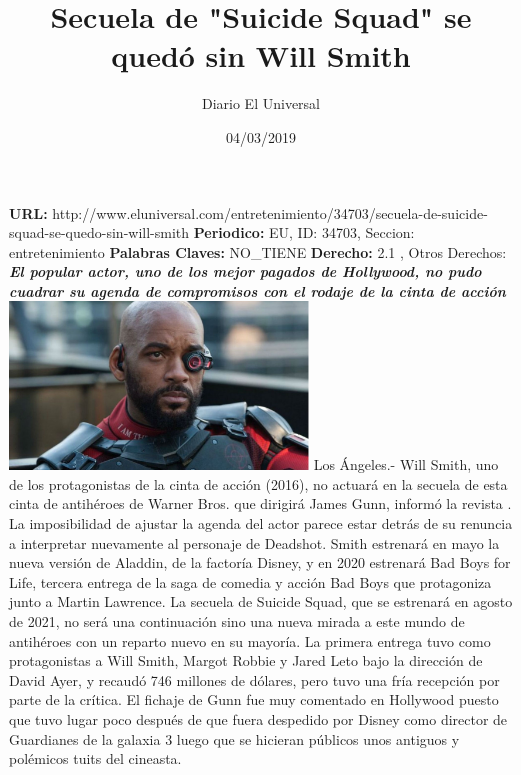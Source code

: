 \documentclass{article}%
\title{\textbf{Secuela de "Suicide Squad" se quedó sin Will Smith}}%
\author{Diario El Universal}%
\date{04/03/2019}%
\begin{document}
%
\normalsize%
\maketitle%
\textbf{URL: }%
http://www.eluniversal.com/entretenimiento/34703/secuela{-}de{-}suicide{-}squad{-}se{-}quedo{-}sin{-}will{-}smith\newline%
%
\textbf{Periodico: }%
EU, %
ID: %
34703, %
Seccion: %
entretenimiento\newline%
%
\textbf{Palabras Claves: }%
NO\_TIENE\newline%
%
\textbf{Derecho: }%
2.1%
, Otros Derechos: %
\newline%
%
\textbf{\textit{El popular actor, uno de los mejor pagados de Hollywood, no pudo cuadrar su agenda de compromisos con el rodaje de la cinta de acción}}%
\newline%
\newline%
%
\includegraphics[width=300px]{EU_34703.jpg}%
\newline%
%
Los Ángeles.{-} Will Smith, uno de los protagonistas de la cinta de acción%
\newline%
%
(2016), no actuará en la secuela de esta cinta de antihéroes de Warner Bros. que dirigirá James Gunn, informó la revista%
\newline%
%
.%
\newline%
%
La imposibilidad de ajustar la agenda del actor parece estar detrás de su renuncia a interpretar nuevamente al personaje de Deadshot.%
\newline%
%
Smith estrenará en mayo la nueva versión de Aladdin, de la factoría Disney, y en 2020 estrenará Bad Boys for Life, tercera entrega de la saga de comedia y acción Bad Boys que protagoniza junto a Martin Lawrence.%
\newline%
%
La secuela de Suicide Squad, que se estrenará en agosto de 2021, no será una continuación sino una nueva mirada a este mundo de antihéroes con un reparto nuevo en su mayoría.%
\newline%
%
La primera entrega tuvo como protagonistas a Will Smith, Margot Robbie y Jared Leto bajo la dirección de David Ayer, y recaudó 746 millones de dólares, pero tuvo una fría recepción por parte de la crítica.%
\newline%
%
El fichaje de Gunn fue muy comentado en Hollywood puesto que tuvo lugar poco después de que fuera despedido por Disney como director de Guardianes de la galaxia 3 luego que se hicieran públicos unos antiguos y polémicos tuits del cineasta.%
\newline%
%
\end{document}
